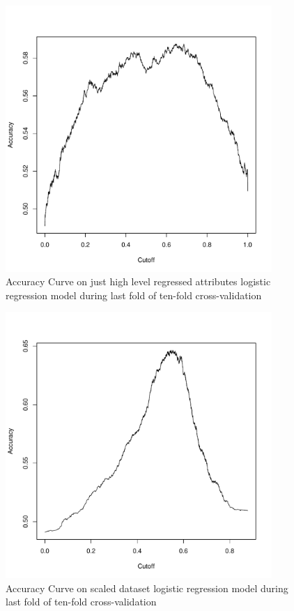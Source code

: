 \documentclass[11pt]{article}
\begin{document}
\begin{figure}[H]
  \centering
    \includegraphics[width=0.9\textwidth]{t3/acc_reg_hl}
    \caption{Accuracy Curve on just high level regressed attributes logistic regression model during last fold of ten-fold cross-validation}
    \label{fig:t3_acc_reg_hl}
\end{figure}
\begin{figure}[H]
  \centering
    \includegraphics[width=0.9\textwidth]{t3/acc_scaled}
    \caption{Accuracy Curve on scaled dataset logistic regression model during last fold of ten-fold cross-validation}
    \label{fig:t3_acc_scaled}
\end{figure}
\end{document}
